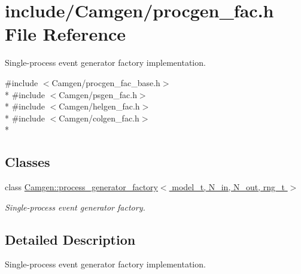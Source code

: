 \hypertarget{a00733}{}\section{include/\+Camgen/procgen\+\_\+fac.h File Reference}
\label{a00733}


Single-\/process event generator factory implementation.  


{\ttfamily \#include $<$Camgen/procgen\+\_\+fac\+\_\+base.\+h$>$}\\*
{\ttfamily \#include $<$Camgen/psgen\+\_\+fac.\+h$>$}\\*
{\ttfamily \#include $<$Camgen/helgen\+\_\+fac.\+h$>$}\\*
{\ttfamily \#include $<$Camgen/colgen\+\_\+fac.\+h$>$}\\*
\subsection*{Classes}
\begin{DoxyCompactItemize}
\item 
class \hyperlink{a00437}{Camgen\+::process\+\_\+generator\+\_\+factory$<$ model\+\_\+t, N\+\_\+in, N\+\_\+out, rng\+\_\+t $>$}
\begin{DoxyCompactList}\small\item\em Single-\/process event generator factory. \end{DoxyCompactList}\end{DoxyCompactItemize}


\subsection{Detailed Description}
Single-\/process event generator factory implementation. 

